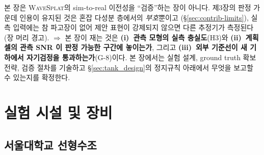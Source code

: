 \documentclass[11pt]{report}
\numberwithin{equation}{chapter}
\numberwithin{figure}{chapter}
\numberwithin{table}{chapter}
\newcommand{\WS}{\textsc{WaveSplat}}
\begin{document}
본 장은 \WS{}의 sim-to-real 이전성을 ``검증''하는 장이 아니다.
제3장의 판정 가운데 인용이 유지된 것은 혼잡 다성분 층에서의 \emph{부호}뿐이고
(\S\ref{sec:contrib-limits}), 실측 입력에는 참 파고장이 없어 제안 표현이 강제되지 않으면
다른 추정기가 측정된다(장 머리 경고).
$\Rightarrow$ 본 장이 재는 것은 \textbf{(i)~관측 모형의 실측 충실도}(H3)와
\textbf{(ii)~계획 셀의 관측 SNR 이 판정 가능한 구간에 놓이는가},
그리고 \textbf{(iii)~외부 기준선이 새 기하에서 자기검정을 통과하는가}(G-8)이다.
본 장에서는 실험 설계, ground truth 확보 전략, 검증 절차를 기술하고
\S\ref{sec:tank_design}의 정지규칙 아래에서 무엇을 보고할 수 있는지를 확정한다.

\section{실험 시설 및 장비}
\label{sec:tank_facility}

\subsection{서울대학교 선형수조}
\end{document}
